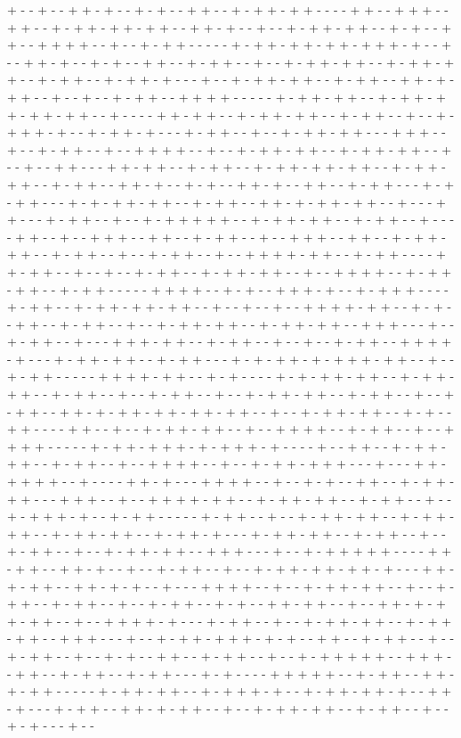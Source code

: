 + - - + - - + + - + - - + - + - - + + - - + - + + - + + - - - - + + - - + + + - - + + - - + - + + - + + - + + - - + + - + - - + - - + - + + - + + - - + - + - - + + - - + + + + - - + - - + - + + - - - - - + - + + - + + - + + - + + + - + - - + - - + + - + - - + - + - - + + - - + - + + - - + - - + - + + - + + - - + - + + - + + - - + - + + - - + - + + - + - - - + - - + - + + - + + - - + - + + - - + + - + - + + - - + - - + - - + - + + - - + + + + - - - - - + - + + - + + - - + - + + - + + - + + - + + - - + - - - - + + - + + - - + - + + - + + - - + - + + - - + - - + - + + + - + - - + - + + - + - - - + - + + - - + - - + - + + - + + - - - + + + - - + - - + - + + - - + - - + + + + - - + - - + - + + - + + - - + - + + - + + - - + - - + - - + + - - - + + - + + - - + - + + - - + - + + - + + - + + - - + - + + - + + - - + - + + - - + + - + - - + - + - - + + - + - - + + - - + - + + - - - + - + - + + - - - + - + - + + - + + - - + - + + - - + + - + - + + - + + - - + - - - + + - - - + - + + - - + - - + - + + + + + - - + - + + - + + - - + - + + - - + - - - - + + - - + - - + + + - - + + - - + - + + - - + - - + + + - - + + - - + - + + - + + - - + - + + - - + - - + - + + - - + - - + + + + - + + - - + - + + - - - - + + - + + - - + - - + - - + - + + - - + - + + - + + - - + - - + + + + - - + - + + - + + - - + - + + - - - - - + + + + - - + - + - - + + + - + - - + - + + + - - - - + - + + - - + - + + - + + - + + - - + - - + - - + - - + + + + - + + - - + - + - - + + - - + - + + - - + - - + - + + - + + - - + - + + - + + - - + + + - - - + - - + - + + - - + - - - + + + - + + - - + - + + - - + - - + - - + - + + - - + + + + - + - - - + - + + - + + - - + - + + - - - + - + - + + - + - + + + - + + - - + - - + - + + - - - - - + + + + - + + - - + - + - - - - + - + - + + - + + - - + - + + - + + - - + - + + - - + - - + - + + - - + - - + - + + - + + - - + - + + - - + - - + - + + - - + + - + - + + - + + - + + - + + - - + - - + - + + - + + - - + - + - - + + - - - - + + - - + - - + - + + - + + - - + - - + + + + - - + - + + - - + - - + + + + - - - - - + - + + - + + + - + - + + + - + - - - - + - - + + - - + - + + - + + - - + - + + - - + - - + + + + - - + - - + - + + - + + + - - - + - - - + + - + + + + - - + - - - - + + - + - - - + + + + - - + - - + - + - - + + - - + - + + - + + - - - + + + - - + - - + + + + - + + - - + - + + - + + - - + - + + - - + - - + - + + + - + - - + - + + - - - - - + - + + - - + - - + - + + - + + - - + - + + - + + - - + - + + - + + - - + - + + - + - - - + - + + - + + - - + - + + - - + - - + - + + - - + - - + - + + - + + - - + + + - - - + - - + - + + + + + - - - - + + - + + - - + + - + - - + - - + - + + - - + - - + - + + - + + - + + - + - - - + + - + - + + - - + + - + - + - - + - - - + + + + - - + - - + - + + - + + - - + - - + - + + - - + - + + - - + - - + - + + - - + - + - - + + - + + - - + - - + + - + - + + - + + - - + - - + + + + - + - - - + - + + - - + - - + - + + - + + - - + - + + - + + - - + + + - - - + - - + - + + - + + + - + - + - - + + - - + - + + - - + - - + - + + - - + - - + - + - - + + - - + - + + - - + - - + - + + + + + - - + + + - - + + - - + - + + - - + - + + - - - + - + - - - - + + + + + - - + - + + - - + + - + - + + - - - - - + - + + - + + - - + - + + + - + - - + - + + - + + - + - - + + - + - - - + - + + - - + + - + - + + - - + - - + - + + - + + - - + - + + - - + - - + - + - - - + - - 